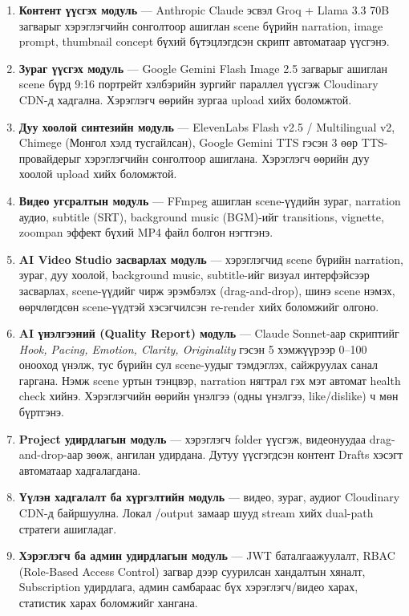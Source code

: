 \begin{enumerate}
  \item \textbf{Контент үүсгэх модуль} — Anthropic Claude эсвэл Groq + Llama 3.3 70B загварыг хэрэглэгчийн сонголтоор ашиглан scene бүрийн narration, image prompt, thumbnail concept бүхий бүтэцлэгдсэн скрипт автоматаар үүсгэнэ.

  \item \textbf{Зураг үүсгэх модуль} — Google Gemini Flash Image 2.5 загварыг ашиглан scene бүрд 9:16 портрейт хэлбэрийн зургийг параллел үүсгэж Cloudinary CDN-д хадгална. Хэрэглэгч өөрийн зургаа upload хийх боломжтой.

  \item \textbf{Дуу хоолой синтезийн модуль} — ElevenLabs Flash v2.5 / Multilingual v2, Chimege (Монгол хэлд тусгайлсан), Google Gemini TTS гэсэн 3 өөр TTS-провайдерыг хэрэглэгчийн сонголтоор ашиглана. Хэрэглэгч өөрийн дуу хоолой upload хийх боломжтой.

  \item \textbf{Видео угсралтын модуль} — FFmpeg ашиглан scene-үүдийн зураг, narration аудио, subtitle (SRT), background music (BGM)-ийг transitions, vignette, zoompan эффект бүхий MP4 файл болгон нэгтгэнэ.

  \item \textbf{AI Video Studio засварлах модуль} — хэрэглэгчид scene бүрийн narration, зураг, дуу хоолой, background music, subtitle-ийг визуал интерфэйсээр засварлах, scene-үүдийг чирж эрэмбэлэх (drag-and-drop), шинэ scene нэмэх, өөрчлөгдсөн scene-үүдтэй хэсэгчилсэн re-render хийх боломжийг олгоно.

  \item \textbf{AI үнэлгээний (Quality Report) модуль} — Claude Sonnet-аар скриптийг \textit{Hook, Pacing, Emotion, Clarity, Originality} гэсэн 5 хэмжүүрээр 0–100 онооход үнэлж, тус бүрийн сул scene-уудыг тэмдэглэх, сайжруулах санал гаргана. Нэмж scene уртын тэнцвэр, narration нягтрал гэх мэт автомат health check хийнэ. Хэрэглэгчийн өөрийн үнэлгээ (одны үнэлгээ, like/dislike) ч мөн бүртгэнэ.

  \item \textbf{Project удирдлагын модуль} — хэрэглэгч folder үүсгэж, видеонуудаа drag-and-drop-аар зөөж, ангилан удирдана. Дутуу үүсгэгдсэн контент Drafts хэсэгт автоматаар хадгалагдана.

  \item \textbf{Үүлэн хадгалалт ба хүргэлтийн модуль} — видео, зураг, аудиог Cloudinary CDN-д байршуулна. Локал /output замаар шууд stream хийх dual-path стратеги ашигладаг.

  \item \textbf{Хэрэглэгч ба админ удирдлагын модуль} — JWT баталгаажуулалт, RBAC (Role-Based Access Control) загвар дээр суурилсан хандалтын хяналт, Subscription удирдлага, админ самбараас бүх хэрэглэгч/видео харах, статистик харах боломжийг хангана.
\end{enumerate}

